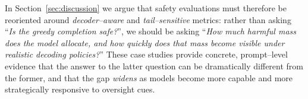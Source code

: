 In Section~\ref{sec:discussion} we argue that safety evaluations must
therefore be reoriented around \emph{decoder--aware} and
\emph{tail--sensitive} metrics:
rather than asking ``\emph{Is the greedy completion safe?}'', we should
be asking ``\emph{How much harmful mass does the model allocate, and
how quickly does that mass become visible under realistic decoding
policies?}''
These case studies provide concrete, prompt--level evidence that the
answer to the latter question can be dramatically different from the
former, and that the gap \emph{widens} as models become more capable
and more strategically responsive to oversight cues.

